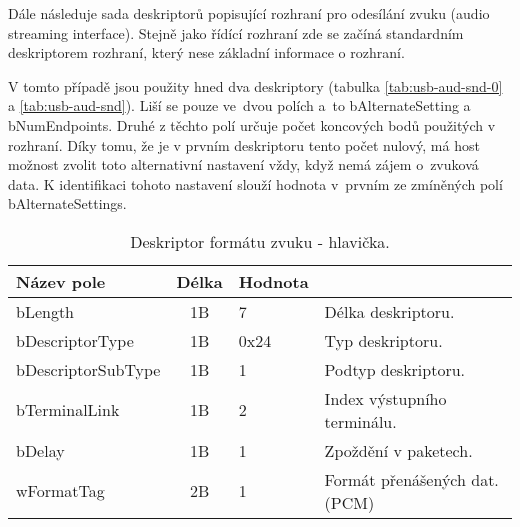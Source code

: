 Dále následuje sada deskriptorů popisující rozhraní pro odesílání zvuku (audio streaming interface). Stejně jako řídící rozhraní zde se začíná standardním  deskriptorem rozhraní, který nese základní informace o rozhraní.

V tomto případě jsou použity hned dva deskriptory (tabulka \ref{tab:usb-aud-snd-0} a \ref{tab:usb-aud-snd}). Liší se pouze ve~dvou polích a~to   bAlternateSetting a bNumEndpoints. Druhé z těchto polí určuje počet koncových bodů použitých v rozhraní. Díky tomu, že je v prvním deskriptoru tento počet nulový, má host možnost zvolit toto alternativní nastavení vždy, když nemá zájem o~zvuková data. K identifikaci tohoto nastavení slouží hodnota v~prvním ze zmíněných polí bAlternateSettings.

\begin{table}[ht!]
\begin{center}
\begin{tabular}{|l|c|l|l|}
\hline 
Název pole & Délka & Hodnota &  \\ 
\hline
bLength & 1B & 7 & Délka deskriptoru.\\
\hline
bDescriptorType & 1B & 0x24 & Typ deskriptoru. \\
\hline
bDescriptorSubType & 1B & 1 & Podtyp deskriptoru. \\
\hline
bTerminalLink & 1B & 2 & Index výstupního terminálu.\\ 
\hline
bDelay & 1B & 1 & Zpoždění v paketech.\\ 
\hline
wFormatTag & 2B & 1 & Formát přenášených dat. (PCM)\\ 
\hline
\end{tabular} 
\end{center}
\caption{Deskriptor formátu zvuku - hlavička.}
\label{tab:usb-aud-snd-fmt-head} 
\end{table}

